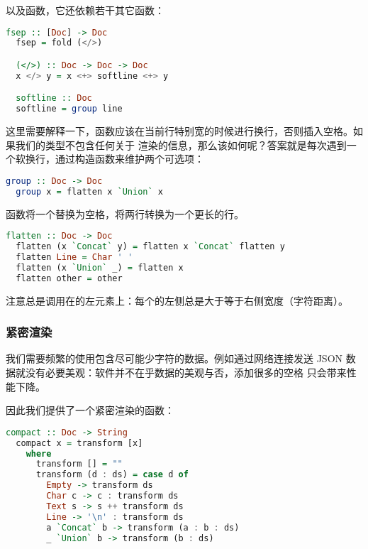\documentclass[./main.tex]{subfiles}
\begin{document}
以及函数，它还依赖若干其它函数：

\begin{lstlisting}[language=Haskell]
  fsep :: [Doc] -> Doc
  fsep = fold (</>)

  (</>) :: Doc -> Doc -> Doc
  x </> y = x <+> softline <+> y

  softline :: Doc
  softline = group line
\end{lstlisting}

这里需要解释一下，函数应该在当前行特别宽的时候进行换行，否则插入空格。如果我们的类型不包含任何关于
渲染的信息，那么该如何呢？答案就是每次遇到一个软换行，通过构造函数来维护两个可选项：

\begin{lstlisting}[language=Haskell]
  group :: Doc -> Doc
  group x = flatten x `Union` x
\end{lstlisting}

函数将一个替换为空格，将两行转换为一个更长的行。

\begin{lstlisting}[language=Haskell]
  flatten :: Doc -> Doc
  flatten (x `Concat` y) = flatten x `Concat` flatten y
  flatten Line = Char ' '
  flatten (x `Union` _) = flatten x
  flatten other = other
\end{lstlisting}

注意总是调用在的左元素上：每个的左侧总是大于等于右侧宽度（字符距离）。

\subsubsection*{紧密渲染}

我们需要频繁的使用包含尽可能少字符的数据。例如通过网络连接发送 JSON 数据就没有必要美观：软件并不在乎数据的美观与否，添加很多的空格
只会带来性能下降。

因此我们提供了一个紧密渲染的函数：

\begin{lstlisting}[language=Haskell]
  compact :: Doc -> String
  compact x = transform [x]
    where
      transform [] = ""
      transform (d : ds) = case d of
        Empty -> transform ds
        Char c -> c : transform ds
        Text s -> s ++ transform ds
        Line -> '\n' : transform ds
        a `Concat` b -> transform (a : b : ds)
        _ `Union` b -> transform (b : ds)
\end{lstlisting}
\end{document}
